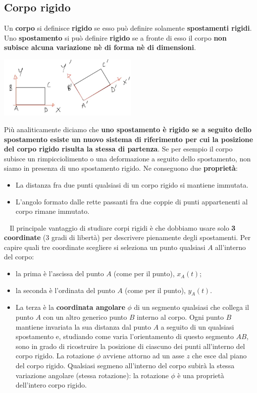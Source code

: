 \subsection{Corpo rigido}
Un \textbf{corpo} si definisce \textbf{rigido} se esso può definire solamente \textbf{spostamenti rigidi}. Uno \textbf{spostamento} si può definire \textbf{rigido} se a fronte di esso il corpo \textbf{non subisce alcuna variazione nè di forma nè di dimensioni}.
\begin{center}
    \includegraphics[height=3cm]{../lezione2/img1.JPG}
\end{center}
Più analiticamente diciamo che \textbf{uno spostamento è rigido se a seguito dello spostamento esiste un nuovo sistema di riferimento per cui la posizione del corpo rigido risulta la stessa di partenza}.\newline
Se per esempio il corpo subisce un rimpicciolimento o una deformazione a seguito dello spostamento, non siamo in presenza di uno spostamento rigido.\newline
\newline
Ne conseguono due \textbf{proprietà}:
\begin{itemize}
    \item La distanza fra due punti qualsiasi di un corpo rigido si mantiene immutata.
    \item L'angolo formato dalle rette passanti fra due coppie di punti appartenenti al corpo rimane immutato.
\end{itemize}
\ \newline
Il principale vantaggio di studiare corpi rigidi è che dobbiamo usare solo \textbf{3 coordinate} (3 gradi di libertà) per descrivere pienamente degli spostamenti.\newline
Per capire quali tre coordinate scegliere si seleziona un punto qualsiasi $A$ all'interno del corpo:
\begin{itemize}
    \item la prima è l'ascissa del punto $A$ (come per il punto), $x_A(t)$;
    \item la seconda è l'ordinata del punto $A$ (come per il punto), $y_A(t)$.
    \item La terza è la \textbf{coordinata angolare} $\phi$ di un segmento qualsiasi che collega il punto $A$ con un altro generico punto $B$ interno al corpo. Ogni punto $B$ mantiene invariata la sua distanza dal punto $A$ a seguito di un qualsiasi spostamento e, studiando come varia l'orientamento di questo segmento $AB$, sono in grado di ricostruire la posizione di ciascuno dei punti all'interno del corpo rigido. La rotazione $\phi$ avviene attorno ad un asse $z$ che esce dal piano del corpo rigido. Qualsiasi segmeno all'interno del corpo subirà la stessa variazione angolare (stessa rotazione): la rotazione $\phi$ è una proprietà dell'intero corpo rigido.
\end{itemize}
